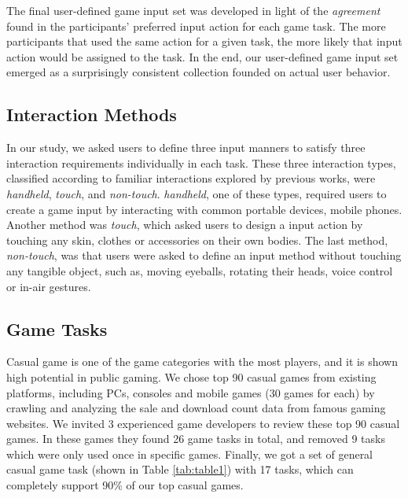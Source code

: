 \documentclass{sigchi}
\begin{document}
    The final user-defined game input set was developed in light of the \textsl{agreement} found in the participants' preferred input action for each game task. The more participants that used the same action for a given task, the more likely that input action would be assigned to the task. In the end, our user-defined game input set emerged as a surprisingly consistent collection founded on actual user behavior.

    \subsection {Interaction Methods}
    In our study, we asked users to define three input manners to satisfy three interaction requirements individually in each task. These three interaction types, classified according to familiar interactions explored by previous works, were \textsl{handheld}, \textsl{touch}, and \textsl{non-touch}. \textsl{handheld}, one of these types, required users to create a game input by interacting with common portable devices, mobile phones. Another method was \textsl{touch}, which asked users to design a input action by touching any skin, clothes or accessories on their own bodies. The last method, \textsl{non-touch}, was that users were asked to define an input method without touching any tangible object, such as, moving eyeballs, rotating their heads, voice control or in-air gestures. 

    \subsection {Game Tasks}
    Casual game is one of the game categories with the most players\cite{esa_ef_2014}, and it is shown high potential in public gaming\cite{Jurgelionis:2011:PET:2027456.2027462,Reis:2012:EMC:2405577.2405651,Biskupski:2014:DEB:2559206.2580097}. We chose top 90 casual games\cite{TopGames} from existing platforms, including PCs, consoles and mobile games (30 games for each) by crawling and analyzing the sale and download count data from famous gaming websites\cite{appannie,VGChartz,Steam,GameStop}. We invited 3 experienced game developers to review these top 90 casual games. In these games they found 26 game tasks in total, and removed 9 tasks which were only used once in specific games. Finally, we got a set of general casual game task (shown in Table \ref{tab:table1}) with 17 tasks, which can completely support 90\% of our top casual games. 
\end{document}
